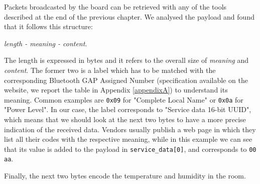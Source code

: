 Packets broadcasted by the board can be retrieved with any of the tools described at the end of the previous chapter. We analysed the payload and found that it follows this structure:
\begin{center}
	\textit{length - meaning - content}.
\end{center}
The length is expressed in bytes and it refers to the overall size of \textit{meaning} and \textit{content}. The former two is a label which has to be matched with the corresponding Bluetooth GAP Assigned Number (specification available on the website, we report the table in Appendix \ref{appendixA}) to understand its meaning. Common examples are \texttt{0x09} for "Complete Local Name" or \texttt{0x0a} for "Power Level". In our case, the label corresponds to "Service data 16-bit UUID", which means that we should look at the next two bytes to have a more precise indication of the received data. Vendors usually publish a web page in which they list all their codes with the respective meaning, while in this example we can see that its value is added to the payload in \texttt{service\_data[0]}, and corresponds to \texttt{00 aa}.

Finally, the next two bytes encode the temperature and humidity in the room.
